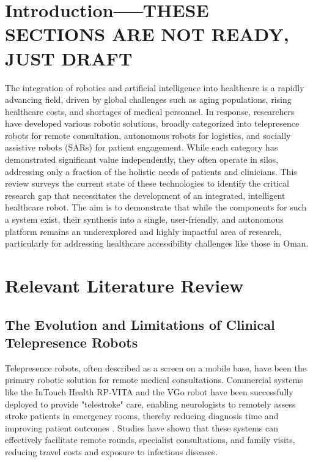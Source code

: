 \documentclass[11pt,a4paper]{article}
\begin{document}
\newpage
\setcounter{section}{0} %

\section{Introduction-----THESE SECTIONS ARE NOT READY, JUST DRAFT}

The integration of robotics and artificial intelligence into healthcare is a rapidly advancing field, driven by global challenges such as aging populations, rising healthcare costs, and shortages of medical personnel. In response, researchers have developed various robotic solutions, broadly categorized into telepresence robots for remote consultation, autonomous robots for logistics, and socially assistive robots (SARs) for patient engagement. While each category has demonstrated significant value independently, they often operate in silos, addressing only a fraction of the holistic needs of patients and clinicians. This review surveys the current state of these technologies to identify the critical research gap that necessitates the development of an integrated, intelligent healthcare robot. The aim is to demonstrate that while the components for such a system exist, their synthesis into a single, user-friendly, and autonomous platform remains an underexplored and highly impactful area of research, particularly for addressing healthcare accessibility challenges like those in Oman.

\section{Relevant Literature Review}

\subsection{The Evolution and Limitations of Clinical Telepresence Robots}

Telepresence robots, often described as a screen on a mobile base, have been the primary robotic solution for remote medical consultations. Commercial systems like the InTouch Health RP-VITA and the VGo robot have been successfully deployed to provide "telestroke" care, enabling neurologists to remotely assess stroke patients in emergency rooms, thereby reducing diagnosis time and improving patient outcomes \cite{garingo2016}. Studies have shown that these systems can effectively facilitate remote rounds, specialist consultations, and family visits, reducing travel costs and exposure to infectious diseases.
\end{document}
